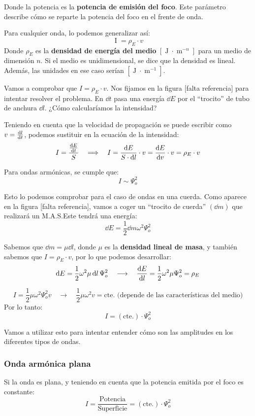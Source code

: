 \documentclass[a4paper]{book}
\numberwithin{figure}{chapter}
\numberwithin{equation}{chapter}
\newcommand{\I}{\operatorname{I}}
\newcommand{\m}{\operatorname{m}}
\newcommand{\J}{\operatorname{J}}
\newcommand{\mas}{M.A.S.}
\begin{document}
Donde la potencia es la \textbf{potencia de emisión del foco}. Este parámetro describe cómo se reparte la potencia del foco en el frente de onda.

Para cualquier onda, lo podemos generalizar así:
\[\I =\rho_E \cdot v\]
Donde $\rho_E$  es la \textbf{densidad de energía del medio} $[\J\cdot \m^{-n}]$ para un medio de dimensión $n$. Si el medio es unidimensional, se dice que la densidad es lineal. Además, las unidades en ese caso serían $[\J\cdot \m^{-1}]$.

Vamos a comprobar que $I = \rho_E \cdot v$. Nos fijamos en la figura [falta referencia] para intentar resolver el problema. En $\dd{t}$ pasa una energía $\dd{E}$ por el ``trocito'' de tubo de anchura $\dd{l}$. ¿Cómo calcularíamos la intensidad?

Teniendo en cuenta que la velocidad de propagación se puede escribir como $v = \dv{l}{t}$, podemos sustituir en la ecuación de la intensidad:
\[I = \frac{\dv{E}{t}}{S} \quad \Longrightarrow \quad I = \frac{\dd{E}}{S\cdot \dd{l}}\cdot v = \dv{E}{v}\cdot v = \rho_E\cdot v\]

Para ondas armónicas, se cumple que:
\[I\sim \Psi_o^2\]

Esto lo podemos comprobar para el caso de ondas en una cuerda. Como aparece en la figura [falta referencia], vamos a coger un ``trocito de cuerda'' $(\dd{m})$ que realizará un \mas\space Este tendrá una energía:
\[\dd{E} = \frac{1}{2}\dd{m}\omega^2\Psi_o^2\]

Sabemos que $\dd{m} = \mu \dd{l}$, donde $\mu$ es la \textbf{densidad lineal de masa}, y también sabemos que $I=\rho_E\cdot v$, por lo que podemos desarrollar:
\[\dd{E} = \frac{1}{2}\omega^2 \mu \dd{l}\Psi_o^2 \quad \longrightarrow \quad \dv{E}{l} = \frac{1}{2}\omega^2\mu\Psi_o^2 = \rho _E\]

\[I=\frac{1}{2}\mu \omega^2\Psi_o^2v \quad \longrightarrow \quad \frac{1}{2}\mu\omega^2v = \text{cte. (depende de las características del medio)}\]
Por lo tanto:
\[I = (\text{cte.})\cdot \Psi_o^2\]

Vamos a utilizar esto para intentar entender cómo son las amplitudes en los diferentes tipos de ondas.

\subsubsection{Onda armónica plana}
Si la onda es plana, y teniendo en cuenta que la potencia emitida por el foco es constante:
\[I = \frac{\text{Potencia}}{\text{Superficie}} = (\text{cte.})\cdot \Psi_o^2\]
\end{document}
